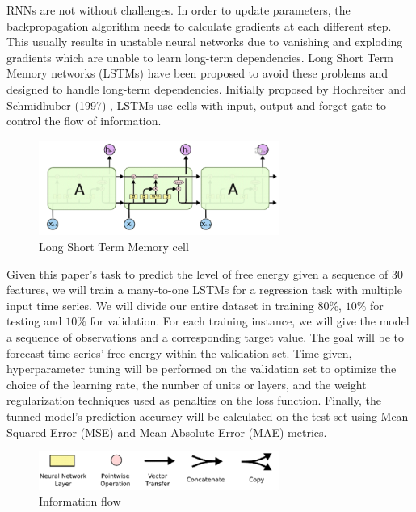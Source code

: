 \documentclass{article}
\begin{document}
RNNs are not without challenges. In order to update parameters, the backpropagation algorithm needs to calculate gradients at each different step. This usually results in unstable neural networks due to vanishing and exploding gradients which are unable to learn long-term dependencies. Long Short Term Memory networks (LSTMs) have been proposed to avoid these problems and designed to handle long-term dependencies. Initially proposed by Hochreiter and Schmidhuber (1997) \cite{hochreiter1997long},  LSTMs use cells with input, output and forget-gate to control the flow of information. 
\begin{figure}
    \caption{Long Short Term Memory cell}
    \includegraphics[width=0.7\textwidth]{images/2023-03-17-16-38-22.png}
\end{figure}



Given this paper's task to predict the level of free energy given a sequence of 30 features, we will train a many-to-one LSTMs for a regression task with multiple input time series. We will divide our entire dataset in training $80\%$, $10\%$ for testing and $10\%$ for validation. For each training instance, we will give the model a sequence of observations and a corresponding target value. The goal will be to forecast time series' free energy within the validation set. Time given, hyperparameter tuning will be performed on the validation set to optimize the choice of the learning rate, the number of units or layers, and the weight regularization techniques used as penalties on the loss function. Finally, the tunned model's prediction accuracy will be calculated on the test set using Mean Squared Error (MSE) and Mean Absolute Error (MAE) metrics. 
\begin{figure}
    \caption{Information flow}
    \includegraphics[width=0.7\textwidth]{images/2023-03-17-16-41-25.png}
\end{figure}
\end{document}
